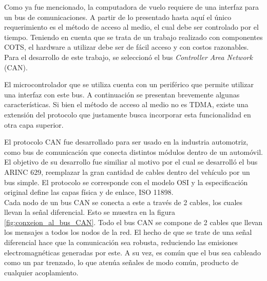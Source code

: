 
Como ya fue mencionado, la computadora de vuelo requiere de una interfaz para un bus de comunicaciones. A partir de lo presentado hasta aquí el único requerimiento es el método de acceso al medio, el cual debe ser controlado por el tiempo. Teniendo en cuenta que se trata de un trabajo realizado con componentes COTS, el hardware a utilizar debe ser de fácil acceso y con costos razonables. Para el desarrollo de este trabajo, se seleccionó el bus \textit{Controller Area Network} (CAN)\cite{specification1991bosch}. 


El microcontrolador que se utiliza cuenta con un periférico que permite utilizar una interfaz con este bus. A continuación se presentan brevemente algunas características. Si bien el método de acceso al medio no es TDMA, existe una extensión del protocolo que justamente busca incorporar esta funcionalidad en otra capa superior.


El protocolo CAN fue desarrollado para ser usado en la industria automotriz, como bus de comunicación que conecta distintos módulos dentro de un automóvil. El objetivo de su desarrollo fue similiar al motivo por el cual se desarrolló el bus ARINC 629, reemplazar la gran cantidad de cables dentro del vehículo por un bus simple. El protocolo se corresponde con el modelo OSI y la especificación original define las capas física y de enlace, ISO 11898.\\

Cada nodo de un bus CAN se conecta a este a través de 2 cables, los cuales llevan la señal diferencial. Esto se muestra en la figura \ref{fig:conxeion_al_bus_CAN}. Todo el bus CAN se compone de 2 cables que llevan los mensajes a todos los nodos de la red. El hecho de que se trate de una señal diferencial hace que la comunicación sea robusta, reduciendo las emisiones electromagnéticas generadas por este. A su vez, es común que el bus sea cableado como un par trenzado, lo que atenúa señales de modo común, producto de cualquier acoplamiento. 

